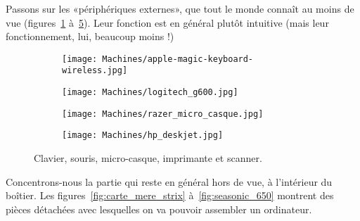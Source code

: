 Passons sur les «périphériques externes», que tout le monde connaît au moins de vue (figures~\ref{fig:apple-magic-keyboard-wireless} à~\ref{fig:hp_deskjet}). Leur fonction est en général plutôt intuitive (mais leur fonctionnement, lui, beaucoup moins !)
\begin{figure}[!htb]
\centering
	\begin{subfigure}[b]{0.3\textwidth}
	\centering
	\texttt{[image: Machines/apple-magic-keyboard-wireless.jpg]}
	\caption{\label{fig:apple-magic-keyboard-wireless}}
	\end{subfigure}
\quad
	\begin{subfigure}[b]{0.2\textwidth}
	\centering
	\texttt{[image: Machines/logitech\_g600.jpg]}
	\caption{\label{fig:logitech_g600}}
	\end{subfigure}
\quad
	\begin{subfigure}[b]{0.2\textwidth}
	\centering
	\texttt{[image: Machines/razer\_micro\_casque.jpg]}
	\caption{\label{fig:razer_micro_casque}}
	\end{subfigure}
\quad
	\begin{subfigure}[b]{0.2\textwidth}
	\centering
	\texttt{[image: Machines/hp\_deskjet.jpg]}
	\caption{\label{fig:hp_deskjet}}
	\end{subfigure}
\caption{\protect{} Clavier, \protect{} souris, \protect{} micro-casque, \protect{} imprimante et scanner.}
\end{figure}
Concentrons-nous la partie qui reste en général hors de vue, à l'intérieur du boîtier. Les figures~\ref{fig:carte_mere_strix} à~\ref{fig:seasonic_650} montrent des pièces détachées avec lesquelles on va pouvoir assembler un ordinateur.
